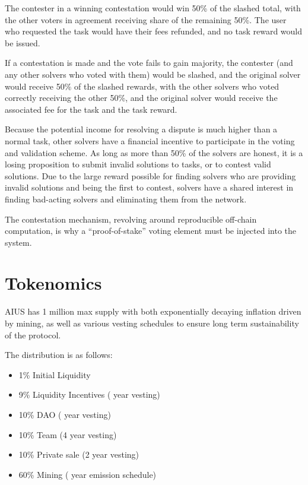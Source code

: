 \documentclass{article}
\begin{document}
The contester in a winning contestation would win 50\% of the slashed total, with the other voters in agreement receiving share of the remaining 50\%. The user who requested the task would have their fees refunded, and no task reward would be issued.

If a contestation is made and the vote fails to gain majority, the contester (and any other solvers who voted with them) would be slashed, and the original solver would receive 50\% of the slashed rewards, with the other solvers who voted correctly receiving the other 50\%, and the original solver would receive the associated fee for the task and the task reward.

Because the potential income for resolving a dispute is much higher than a normal task, other solvers have a financial incentive to participate in the voting and validation scheme. As long as more than 50\% of the solvers are honest, it is a losing proposition to submit invalid solutions to tasks, or to contest valid solutions. Due to the large reward possible for finding solvers who are providing invalid solutions and being the first to contest, solvers have a shared interest in finding bad-acting solvers and eliminating them from the network.

The contestation mechanism, revolving around reproducible off-chain computation, is why a ``proof-of-stake'' voting element must be injected into the system. 


\section{Tokenomics} \label{tokenomics}

AIUS has 1 million max supply with both exponentially decaying inflation driven by mining, as well as various vesting schedules to ensure long term sustainability of the protocol.

The distribution is as follows:

\begin{itemize}
    \item 1\% Initial Liquidity
    \item 9\% Liquidity Incentives ( year vesting)
    \item 10\% DAO ( year vesting)
    \item 10\% Team (4 year vesting)
    \item 10\% Private sale (2 year vesting)
    \item 60\% Mining ( year emission schedule)
\end{itemize}
\end{document}
